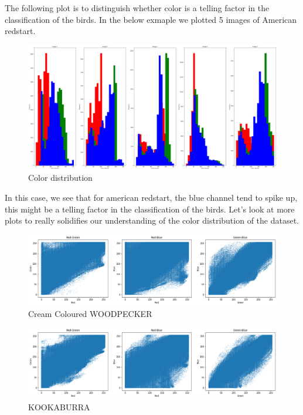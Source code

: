 The following plot is to distinguish whether color is a telling factor in the classification of the birds. In the below exmaple we plotted 5 images of American redstart. 

\begin{figure}[h]
  \centering
  \includegraphics[scale=0.15]{brightness_distri.png}
  \caption{Color distribution }
  \end{figure}

In this case, we see that for american redstart, the blue channel tend to spike up, this might be a telling factor in the classification of the birds. Let's look at more plots to really solidifies our understanding of the color distribution of the dataset.

\begin{figure}[h]
\centering
\includegraphics[scale=0.38]{cream-cloured-corr.png}
\caption{Cream Coloured WOODPECKER}
\end{figure}

\begin{figure}[h]
\centering
\includegraphics[scale=0.38]{kookaburra-corr.png}
\caption{KOOKABURRA}
\end{figure}

